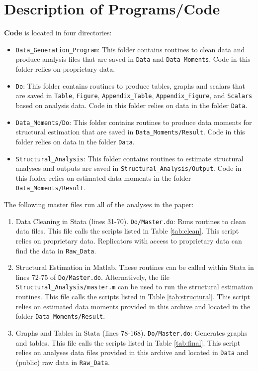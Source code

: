 \documentclass[12pt,notitlepage]{article}
\begin{document}
\clearpage
\section{Description of Programs/Code}

{\bf Code} is located in four directories: 
\begin{itemize}
\item \texttt{Data\_Generation\_Program}: This folder contains routines to clean data and produce analysis files that are saved in \texttt{Data} and \texttt{Data\_Moments}. Code in this folder relies on proprietary data.
\item \texttt{Do}: This folder contains routines to produce tables, graphs and scalars that are saved in \texttt{Table}, \texttt{Figure}, \texttt{Appendix\_Table}, \texttt{Appendix\_Figure}, and  \texttt{Scalars} based on analysis data. Code in this folder relies on data in the folder \texttt{Data}.
\item \texttt{Data\_Moments/Do}: This folder contains routines to produce data moments for structural estimation that are saved in \texttt{Data\_Moments/Result}. Code in this folder relies on data in the folder \texttt{Data}.
\item \texttt{Structural\_Analysis}: This folder contains routines to estimate structural analyses and outputs are saved in \texttt{Structural\_Analysis/Output}. Code in this folder relies on estimated data moments in the folder \texttt{Data\_Moments/Result}.
\end{itemize}

 The following master files run all of the analyses in the paper: 
\begin{enumerate}
\item Data Cleaning in Stata (lines 31-70). \texttt{Do/Master.do}: Runs routines to clean data files. This file calls the scripts listed in Table \ref{tab:clean}. This script relies on proprietary data. Replicators with access to proprietary data can find the data in \texttt{Raw\_Data}.
\item Structural Estimation in Matlab. These routines can be called within Stata in lines 72-75 of \texttt{Do/Master.do}. Alternatively, the file \texttt{Structural\_Analysis/master.m} can be used to run the structural estimation routines. This file calls the scripts listed in Table \ref{tab:structural}. This script relies on estimated data moments provided in this archive and located in the folder \texttt{Data\_Moments/Result}.
\item Graphs and Tables in Stata (lines 78-168). \texttt{Do/Master.do}: Generates graphs and tables. This file calls the scripts listed in Table \ref{tab:final}. This script relies on analyses data files provided in this archive and located in \texttt{Data} and (public) raw data in \texttt{Raw\_Data}.
\end{enumerate}
\end{document}

